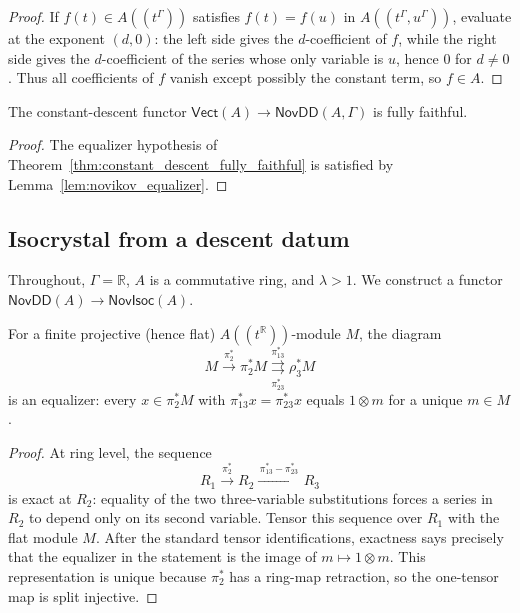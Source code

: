 \begin{proof}
  \leanok
  If $f(t) \in A((t^\Gamma))$ satisfies $f(t) = f(u)$ in $A((t^\Gamma, u^\Gamma))$,
  evaluate at the exponent $(d, 0)$: the left side gives the
  $d$-coefficient of $f$, while the right side gives the
  $d$-coefficient of the series whose only variable is $u$, hence $0$ for $d \neq 0$.
  Thus all coefficients of $f$ vanish except possibly the constant term, so
  $f \in A$.
\end{proof}

\begin{proposition}
  \label{prop:vect_to_novikov_descent_fully_faithful}
  \leanok
  The constant-descent functor
  $\mathsf{Vect}(A) \to \mathsf{NovDD}(A, \Gamma)$ is fully faithful.
\end{proposition}

\begin{proof}
  \leanok
  The equalizer hypothesis of
  Theorem~\ref{thm:constant_descent_fully_faithful}
  is satisfied by Lemma~\ref{lem:novikov_equalizer}.
\end{proof}

\subsection{Isocrystal from a descent datum}

Throughout, $\Gamma = \mathbb{R}$, $A$ is a commutative ring, and $\lambda > 1$.
We construct a functor $\mathsf{NovDD}(A) \to \mathsf{NovIsoc}(A)$.

\begin{lemma}
  \label{lem:pi2_module_equalizer}
  \leanok
  For a finite projective (hence flat) $A((t^{\mathbb{R}}))$-module $M$, the diagram
  \[
    M \xrightarrow{\pi_2^\ast} \pi_2^\ast M
      \overset{\pi_{13}^\ast}{\underset{\pi_{23}^\ast}{\rightrightarrows}}
      \rho_3^\ast M
  \]
  is an equalizer: every $x \in \pi_2^\ast M$ with $\pi_{13}^\ast x = \pi_{23}^\ast x$
  equals $1 \otimes m$ for a unique $m \in M$.
\end{lemma}

\begin{proof}
  \leanok
  At ring level, the sequence
  \[
    R_1\xrightarrow{\pi_2^\ast}R_2
      \xrightarrow{\,\pi_{13}^\ast-\pi_{23}^\ast\,}R_3
  \]
  is exact at $R_2$: equality of the two three-variable substitutions forces a
  series in $R_2$ to depend only on its second variable.  Tensor this sequence
  over $R_1$ with the flat module $M$.  After the standard tensor
  identifications, exactness says precisely that the equalizer in the
  statement is the image of $m\mapsto1\otimes m$.  This representation is
  unique because $\pi_2^\ast$ has a ring-map retraction, so the one-tensor map
  is split injective.
\end{proof}


